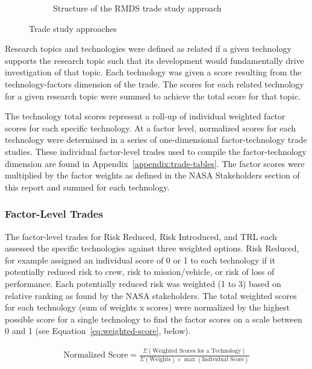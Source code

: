\begin{figure}[tb!]
\begin{center}
\begin{subfigure}{0.49\textwidth}
            \caption{Structure of the RMDS trade study approach}
            \label{figure-hari:tradestudyB}
        \end{subfigure}
        \caption{Trade study approaches}
        \label{figure-hari:tradestudy}
    \end{center}
\end{figure}

Research topics and technologies were defined as related if a given technology supports the research topic such that its development would fundamentally drive investigation of that topic.
Each technology was given a score resulting from the technology-factors dimension of the trade.
The scores for each related technology for a given research topic were summed to achieve the total score for that topic.

The technology total scores represent a roll-up of individual weighted factor scores for each specific technology.
At a factor level, normalized scores for each technology were determined in a series of one-dimensional factor-technology trade studies.
These individual factor-level trades used to compile the factor-technology dimension are found in Appendix~\ref{appendix:trade-tables}.
The factor scores were multiplied by the factor weights as defined in the NASA Stakeholders section of this report and summed for each technology.

\subsubsection{Factor-Level Trades}
The factor-level trades for Risk Reduced, Risk Introduced, and TRL each assessed the specific technologies against three weighted options.
Risk Reduced, for example assigned an individual score of 0 or 1 to each technology if it potentially reduced risk to crew, risk to mission/vehicle, or risk of loss of performance.
Each potentially reduced risk was weighted (1 to 3) based on relative ranking as found by the NASA stakeholders.
The total weighted scores for each technology (sum of weights x scores) were normalized by the highest possible score for a single technology to find the factor scores on a scale between 0 and 1 (see Equation~\ref{eq:weighted-score}, below).

\begin{align}
    \mbox{Normalized Score} =  \frac{{\Sigma}(\mbox{Weighted Scores for a Technology})}{{\Sigma}(\mbox{Weights}) \times \max(\mbox{Individual Score})}
    \label{eq:weighted-score}
\end{align}

